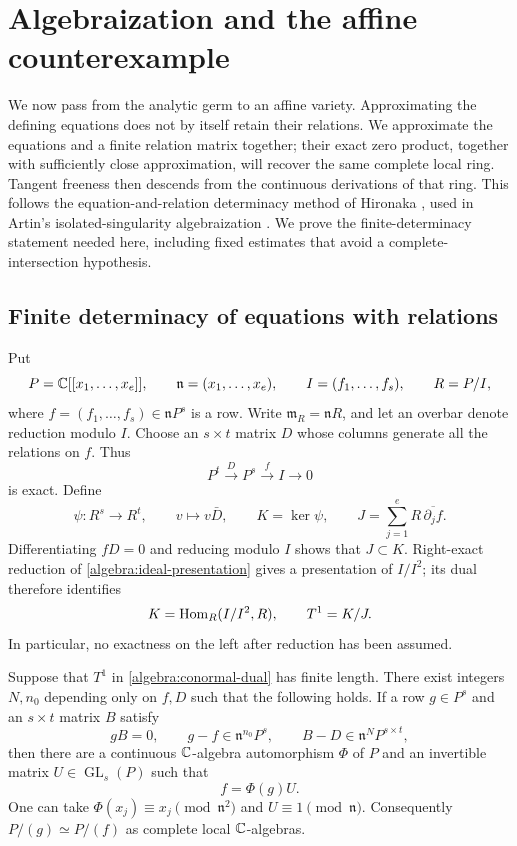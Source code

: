 \section{Algebraization and the affine counterexample}
\label{algebra:section}

We now pass from the analytic germ to an affine variety.  Approximating
the defining equations does not by itself retain their relations.
We approximate the equations and a finite relation matrix together;
their exact zero product, together with sufficiently close approximation,
will recover the same complete local ring.  Tangent freeness then descends
from the continuous derivations of that ring.  This follows the
equation-and-relation determinacy method of Hironaka
\cite[\S3, Theorem~3.3]{Hironaka1969}, used in Artin's
isolated-singularity algebraization
\cite[Theorems~3.8--3.9]{Artin1969}.  We prove the finite-determinacy
statement needed here, including fixed estimates that avoid a
complete-intersection hypothesis.

\subsection{Finite determinacy of equations with relations}

Put
\[
 P=\mathbb C[[x_1,\ldots,x_e]],\qquad
 \mathfrak n=(x_1,\ldots,x_e),\qquad
 I=(f_1,\ldots,f_s),\qquad R=P/I,
\]
where $f=(f_1,\ldots,f_s)\in\mathfrak nP^s$ is a row.  Write
$\mathfrak m_R=\mathfrak nR$, and let an overbar denote reduction modulo $I$.
Choose an $s\times t$ matrix $D$ whose columns generate all the relations
on $f$.  Thus
\begin{equation}
\label{algebra:ideal-presentation}
 P^t\xrightarrow{D}P^s\xrightarrow{f}I\longrightarrow0
\end{equation}
is exact.  Define
\[
 \psi:R^s\longrightarrow R^t,\qquad v\longmapsto v\bar D,
 \qquad K=\ker\psi,
 \qquad
 J=\sum_{j=1}^e R\,\overline{\partial_j f}.
\]
Differentiating $fD=0$ and reducing modulo $I$ shows that $J\subset K$.
Right-exact reduction of \eqref{algebra:ideal-presentation} gives a
presentation of $I/I^2$; its dual therefore identifies
\begin{equation}
\label{algebra:conormal-dual}
 K=\operatorname{Hom}_R(I/I^2,R),\qquad T^1=K/J.
\end{equation}
In particular, no exactness on the left after reduction has been assumed.

\begin{lemma}
\label{algebra:finite-determinacy}
Suppose that $T^1$ in \eqref{algebra:conormal-dual} has finite length.
There exist integers $N,n_0$ depending only on $f,D$ such that the following
holds.  If a row $g\in P^s$ and an $s\times t$ matrix $B$ satisfy
\[
 gB=0,\qquad
 g-f\in\mathfrak n^{n_0}P^s,\qquad
 B-D\in\mathfrak n^NP^{s\times t},
\]
then there are a continuous $\mathbb C$-algebra automorphism $\Phi$ of $P$ and
an invertible matrix $U\in\operatorname{GL}_s(P)$ such that
\[
 f=\Phi(g)U.
\]
One can take $\Phi(x_j)\equiv x_j\pmod{\mathfrak n^2}$ and
$U\equiv1\pmod{\mathfrak n}$.  Consequently $P/(g)\simeq P/(f)$ as
complete local $\mathbb C$-algebras.
\end{lemma}

